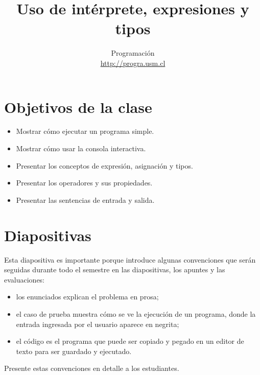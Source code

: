 \documentclass[10pt]{article}
\title{Uso de intérprete, expresiones y tipos}
\author{Programación \\ \url{http://progra.usm.cl}}
\date{}
\begin{document}
  \maketitle

  \section*{Objetivos de la clase}
  \begin{itemize}
    \item Mostrar cómo ejecutar un programa simple.
    \item Mostrar cómo usar la consola interactiva.
    \item Presentar los conceptos de expresión, asignación y tipos.
    \item Presentar los operadores y sus propiedades.
    \item Presentar las sentencias de entrada y salida.
  \end{itemize}

  \section*{Diapositivas}


  Esta diapositiva es importante
  porque introduce algunas convenciones
  que serán seguidas durante todo el semestre
  en las diapositivas, los apuntes y las evaluaciones:
  \begin{itemize}
    \item los enunciados explican el problema en prosa;
    \item el caso de prueba muestra cómo se ve la ejecución de un programa,
      donde la entrada ingresada por el usuario aparece en negrita;
    \item el código es el programa que puede ser copiado y pegado
      en un editor de texto para ser guardado y ejecutado.
  \end{itemize}
  Presente estas convenciones en detalle a los estudiantes.
\end{document}
